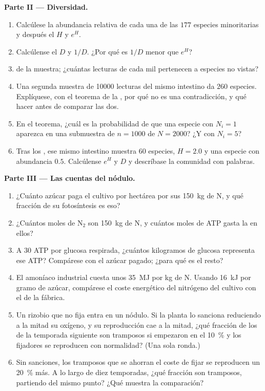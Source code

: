 \begin{problem}
\medskip
\noindent\textbf{Parte II --- Diversidad.}
\begin{enumerate}[resume]
  \item Calcúlese la abundancia relativa de cada una de las $177$
        especies minoritarias y después el  $H$ y
        $e^{H}$.
  \item Calcúlense el  $D$ y $1/D$. ¿Por qué es $1/D$
        menor que $e^{H}$?
  \item {} de la muestra; ¿cuántas lecturas de cada mil
        pertenecen a especies no vistas?
  \item Una segunda muestra de \num{10000} lecturas del mismo intestino
        da $260$ especies. Explíquese, con el teorema de la ,
        por qué no es una contradicción, y qué hacer antes de comparar
        las dos.
  \item En el teorema, ¿cuál es la probabilidad de que una especie con
        $N_{i} = 1$ aparezca en una submuestra de $n = 1000$ de $N =
        2000$? ¿Y con $N_{i} = 5$?
  \item Tras los , ese mismo intestino muestra $60$
        especies, $H = 2.0$ y una especie con abundancia $0.5$.
        Calcúlense $e^{H}$ y $D$ y descríbase la comunidad con palabras.
\end{enumerate}

\medskip
\noindent\textbf{Parte III --- Las cuentas del nódulo.}
\begin{enumerate}[resume]
  \item ¿Cuánto azúcar paga el cultivo por hectárea por sus
        \qty{150}{kg} de N, y qué fracción de su fotosíntesis es eso?
  \item ¿Cuántos moles de N$_{2}$ son \qty{150}{kg} de N, y cuántos moles
        de ATP gasta la  en ellos?
  \item A $30$ ATP por glucosa respirada, ¿cuántos kilogramos de glucosa
        representa ese ATP? Compárese con el azúcar pagado; ¿para qué es
        el resto?
  \item El amoníaco industrial cuesta unos \qty{35}{MJ} por kg de N.
        Usando \qty{16}{kJ} por gramo de azúcar, compárese el coste
        energético del nitrógeno del cultivo con el de la fábrica.
  \item Un rizobio que no fija entra en un nódulo. Si la planta lo
        sanciona reduciendo a la mitad su oxígeno, y su reproducción cae
        a la mitad, ¿qué fracción de los  de la temporada
        siguiente son tramposos si empezaron en el \qty{10}{\%} y los
        fijadores se reproducen con normalidad? (Una sola ronda.)
  \item Sin sanciones, los tramposos que se ahorran el coste de fijar se
        reproducen un \qty{20}{\%} más. A lo largo de diez temporadas,
        ¿qué fracción son tramposos, partiendo del mismo punto? ¿Qué
        muestra la comparación?
\end{enumerate}


\end{problem}
